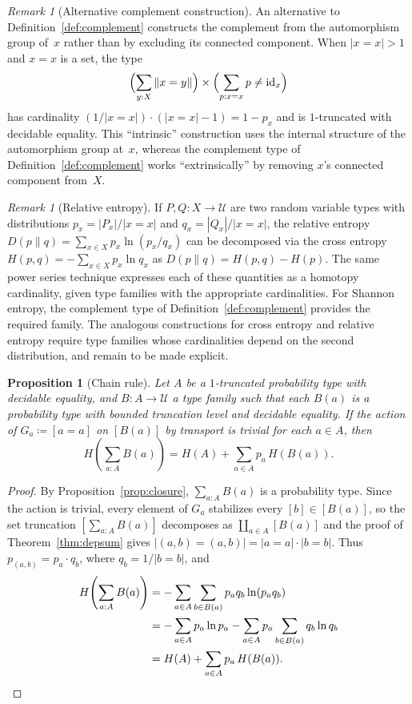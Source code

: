 \documentclass[12pt]{amsart}
\newcommand{\U}{\mathcal{U}}
\newcommand{\Id}{\mathrm{id}}
\theoremstyle{plain}
\newtheorem{proposition}[theorem]{Proposition}
\theoremstyle{definition}
\theoremstyle{remark}
\newtheorem{remark}[theorem]{Remark}
\begin{document}
\begin{remark}[Alternative complement construction]\label{rem:complement-alt}
An alternative to Definition~\ref{def:complement} constructs the complement from the automorphism group of~$x$ rather than by excluding its connected component. When $|x=x|>1$ and $x=x$ is a set, the type
\[
\Bigl(\sum_{y:X}\|x=y\|\Bigr)\times\Bigl(\sum_{p:x=x}p\neq\Id_x\Bigr)
\]
has cardinality $(1/|x=x|)\cdot(|x=x|-1)=1-p_x$ and is $1$-truncated with decidable equality. This ``intrinsic'' construction uses the internal structure of the automorphism group at~$x$, whereas the complement type of Definition~\ref{def:complement} works ``extrinsically'' by removing $x$'s connected component from~$X$.
\end{remark}

\begin{remark}[Relative entropy]\label{rem:relative}
If $P,Q:X\to\U$ are two random variable types with distributions $p_x=|P_x|/|x=x|$ and $q_x=|Q_x|/|x=x|$, the relative entropy $D(p\|q)=\sum_{x\in X}p_x\ln(p_x/q_x)$ can be decomposed via the cross entropy $H(p,q)=-\sum_{x\in X}p_x\ln q_x$ as $D(p\|q)=H(p,q)-H(p)$. The same power series technique expresses each of these quantities as a homotopy cardinality, given type families with the appropriate cardinalities. For Shannon entropy, the complement type of Definition~\ref{def:complement} provides the required family. The analogous constructions for cross entropy and relative entropy require type families whose cardinalities depend on the second distribution, and remain to be made explicit.
\end{remark}

\begin{proposition}[Chain rule]\label{prop:chainrule}
Let $A$ be a $1$-truncated probability type with decidable equality, and $B:A\to\U$ a type family such that each $B(a)$ is a probability type with bounded truncation level and decidable equality. If the action of $G_a\coloneqq [a=a]$ on $[B(a)]$ by transport is trivial for each $a\in A$, then
\[
H\!\left(\sum_{a:A}B(a)\right) = H(A)+\sum_{a\in A}p_a\,H(B(a)).
\]
\end{proposition}

\begin{proof}
By Proposition~\ref{prop:closure}, $\sum_{a:A}B(a)$ is a probability type. Since the action is trivial, every element of $G_a$ stabilizes every $[b]\in[B(a)]$, so the set truncation $[\sum_{a:A}B(a)]$ decomposes as $\coprod_{a\in A}[B(a)]$ and the proof of Theorem~\ref{thm:depsum} gives $|(a,b)=(a,b)|=|a=a|\cdot|b=b|$. Thus $p_{(a,b)}=p_a\cdot q_b$, where $q_b=1/|b=b|$, and
\begin{align*}
H\!\left(\sum_{a:A}B(a)\right) &= -\sum_{a\in A}\sum_{b\in B(a)}p_aq_b\ln(p_aq_b)\\
&= -\sum_{a\in A}p_a\ln p_a - \sum_{a\in A}p_a\sum_{b\in B(a)}q_b\ln q_b\\
&= H(A)+\sum_{a\in A}p_a\,H(B(a)).\qedhere
\end{align*}
\end{proof}
\end{document}
